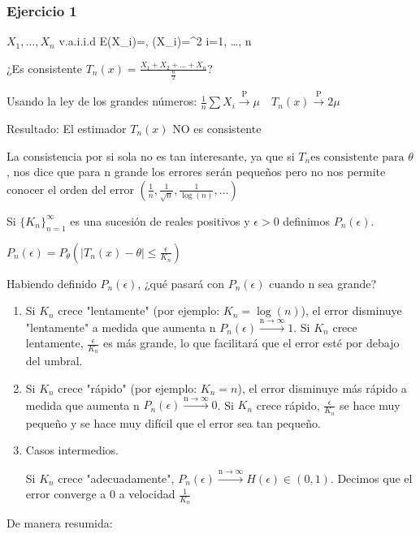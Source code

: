 \subsubsection*{Ejercicio 1}
\(X_1, \dots, X_n \) v.a.i.i.d \quad E(X_i)=\mu, (X_i)=\sigma^2 \quad \forall i=1, \dots, n

¿Es consistente $T_n(x) = \frac{X_1 + X_2 + \dots + X_n}{\frac{n}{2}}$?

Usando la ley de los grandes números:
\(\frac{1}{n}\sum X_i \xrightarrow{\text{P}} \mu \quad T_n(x)\xrightarrow{\text{P}}2\mu\)

Resultado: El estimador \(T_n(x)\) NO es consistente

\newpage

La consistencia por si sola no es tan interesante, ya que si $T_n \text{es consistente para } \theta$, nos dice que para n grande los errores serán pequeños pero no nos permite conocer el orden del error $\left(\frac{1}{n}, \frac{1}{\sqrt{n}},\frac{1}{\log(n)}, \dots\right)$

Si $\{K_n\}_{n=1}^{\infty}$ es una sucesión de reales positivos y $\epsilon>0$ definimos $P_n(\epsilon)$.

\(P_n(\epsilon)=P_\theta(|T_n(x)-\theta| \leq \frac{\epsilon}{K_n})\)

Habiendo definido \(P_n(\epsilon)\), ¿qué pasará con  \(P_n(\epsilon)\) cuando n sea grande?
\begin{enumerate}
    \item Si \(K_n\) crece "lentamente" (por ejemplo:  \(K_n=\log(n)\)), el error disminuye "lentamente" a medida que aumenta n \(P_n(\epsilon) \xrightarrow{{\text{n} \to \infty}} 1\). Si \(K_n\) crece lentamente, \( \frac{\epsilon}{K_n}\) es más grande, lo que facilitará que el error esté por debajo del umbral.
    \item Si \(K_n\) crece "rápido" (por ejemplo:  \(K_n=n\)), el error disminuye más rápido a medida que aumenta n \(P_n(\epsilon) \xrightarrow{{\text{n} \to \infty}} 0\).  Si \(K_n\) crece rápido, \( \frac{\epsilon}{K_n}\) se hace muy pequeño y se hace muy difícil que el error sea tan pequeño.
    \item Casos intermedios.

          Si \(K_n\) crece "adecuadamente", \(P_n(\epsilon) \xrightarrow{{\text{n} \to \infty}} H(\epsilon) \in (0,1)\). Decimos que el error converge a 0 a velocidad \(\frac{1}{K_n}\)
\end{enumerate}
De manera resumida:

